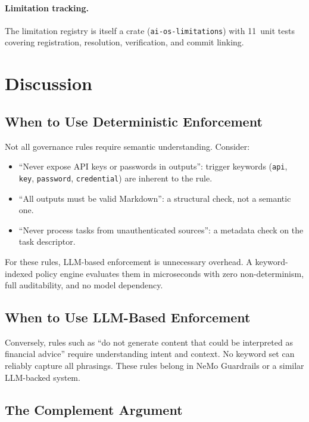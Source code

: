 \documentclass[11pt,a4paper]{article}
\begin{document}
\paragraph{Limitation tracking.}
The limitation registry is itself a crate (\texttt{ai-os-limitations})
with 11~unit tests covering registration, resolution, verification, and
commit linking.

\section{Discussion}
\label{sec:discussion}

\subsection{When to Use Deterministic Enforcement}

Not all governance rules require semantic understanding. Consider:

\begin{itemize}[nosep]
  \item ``Never expose API keys or passwords in outputs'': trigger
    keywords (\texttt{api}, \texttt{key}, \texttt{password},
    \texttt{credential}) are inherent to the rule.
  \item ``All outputs must be valid Markdown'': a structural check,
    not a semantic one.
  \item ``Never process tasks from unauthenticated sources'': a
    metadata check on the task descriptor.
\end{itemize}

For these rules, LLM-based enforcement is unnecessary overhead. A
keyword-indexed policy engine evaluates them in microseconds with
zero non-determinism, full auditability, and no model dependency.

\subsection{When to Use LLM-Based Enforcement}

Conversely, rules such as ``do not generate content that could be
interpreted as financial advice'' require understanding intent and
context. No keyword set can reliably capture all phrasings. These rules
belong in NeMo Guardrails or a similar LLM-backed system.

\subsection{The Complement Argument}
\end{document}
